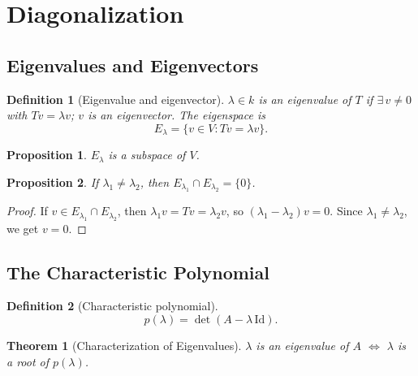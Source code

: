 \documentclass{article}
\newtheorem{theorem}{Theorem}
\newtheorem{definition}{Definition}
\newtheorem{proposition}{Proposition}
\begin{document}
\section{Diagonalization}

\subsection{Eigenvalues and Eigenvectors}
\begin{definition}[Eigenvalue and eigenvector]
    $\lambda\in k$ is an eigenvalue of $T$ if $\exists\, v\neq0$ with $Tv=\lambda v$; $v$ is an eigenvector. The eigenspace is
    \[E_\lambda = \{v\in V : Tv=\lambda v\}.\]
\end{definition}
\begin{proposition}
    $E_\lambda$ is a subspace of $V$.
\end{proposition}
\begin{proposition}
    If $\lambda_1\neq\lambda_2$, then $E_{\lambda_1}\cap E_{\lambda_2}=\{0\}$.
\end{proposition}
\begin{proof}
    If $v\in E_{\lambda_1}\cap E_{\lambda_2}$, then $\lambda_1 v=Tv=\lambda_2 v$, so $(\lambda_1-\lambda_2)v=0$. Since $\lambda_1\neq\lambda_2$, we get $v=0$.
\end{proof}

\subsection{The Characteristic Polynomial}
\begin{definition}[Characteristic polynomial]
    \[p(\lambda) = \det(A - \lambda\,\mathrm{Id}).\]
\end{definition}
\begin{theorem}[Characterization of Eigenvalues]
    $\lambda$ is an eigenvalue of $A$ $\iff$ $\lambda$ is a root of $p(\lambda)$.
\end{theorem}
\end{document}

